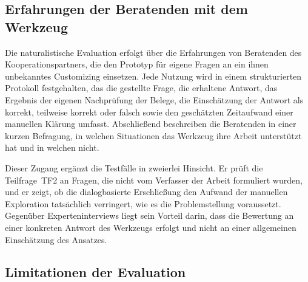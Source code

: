 \subsection{Erfahrungen der Beratenden mit dem Werkzeug}
\label{subsec:eval-erfahrungen}

Die naturalistische Evaluation erfolgt über die Erfahrungen von Beratenden des Kooperationspartners, die den Prototyp für eigene Fragen an ein ihnen unbekanntes Customizing einsetzen. Jede Nutzung wird in einem strukturierten Protokoll festgehalten, das die gestellte Frage, die erhaltene Antwort, das Ergebnis der eigenen Nachprüfung der Belege, die Einschätzung der Antwort als korrekt, teilweise korrekt oder falsch sowie den geschätzten Zeitaufwand einer manuellen Klärung umfasst. Abschließend beschreiben die Beratenden in einer kurzen Befragung, in welchen Situationen das Werkzeug ihre Arbeit unterstützt hat und in welchen nicht. %

Dieser Zugang ergänzt die Testfälle in zweierlei Hinsicht. Er prüft die Teilfrage~TF2 an Fragen, die nicht vom Verfasser der Arbeit formuliert wurden, und er zeigt, ob die dialogbasierte Erschließung den Aufwand der manuellen Exploration tatsächlich verringert, wie es die Problemstellung voraussetzt. Gegenüber Experteninterviews liegt sein Vorteil darin, dass die Bewertung an einer konkreten Antwort des Werkzeugs erfolgt und nicht an einer allgemeinen Einschätzung des Ansatzes.

\subsection{Limitationen der Evaluation}
\label{subsec:eval-limitationen}

